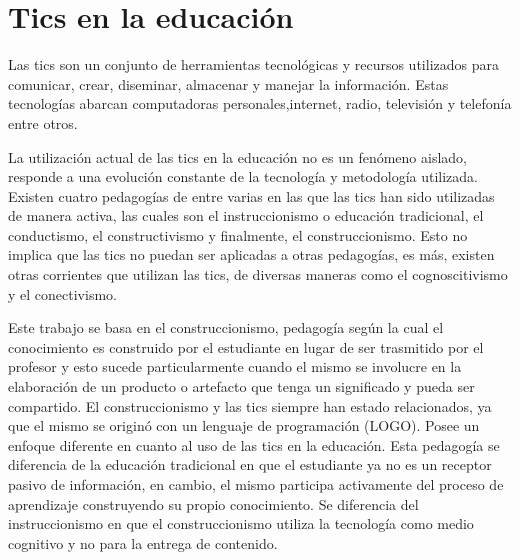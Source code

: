 \section{Tics en la educación}

Las tics son un conjunto de herramientas tecnológicas y recursos utilizados para
comunicar, crear, diseminar, almacenar y manejar la
información\cite{unesco:ict}. Estas tecnologías abarcan computadoras
personales,internet, radio, televisión y telefonía\cite{tinio:ict} entre otros.

La utilización actual de las tics en la educación no es un fenómeno aislado,
responde a una evolución constante de la tecnología y metodología utilizada.
Existen cuatro pedagogías de entre varias en las que las tics han sido
utilizadas de manera activa, las cuales son el instruccionismo o educación
tradicional, el conductismo, el constructivismo y finalmente, el
construccionismo. Esto no implica que las tics no puedan ser aplicadas a otras
pedagogías, es más, existen otras corrientes que utilizan las tics, de diversas
maneras como el cognoscitivismo\cite{egenfeldt2007third} y el
conectivismo\cite{white:ict}. 

Este trabajo se basa en el construccionismo, pedagogía según la cual el
conocimiento es construido por el estudiante en lugar de ser trasmitido por el
profesor\cite{moses:2003} y esto sucede particularmente cuando el mismo se
involucre en la elaboración de un producto o artefacto que tenga un significado
y pueda ser compartido\cite{valdivia:sg}. El construccionismo y las tics siempre
han estado relacionados, ya que el mismo se originó con un lenguaje de
programación (LOGO)\cite{ict:ttc}. Posee un enfoque diferente en cuanto al uso
de las tics en la educación. Esta pedagogía se diferencia de la educación
tradicional en que el estudiante ya no es un receptor pasivo de información, en
cambio, el mismo participa activamente del proceso de aprendizaje construyendo
su propio conocimiento. Se diferencia del instruccionismo en que el
construccionismo utiliza la tecnología como medio cognitivo y no para la entrega
de contenido.

